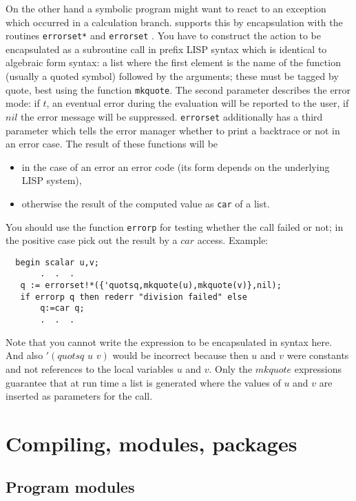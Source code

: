 On the other hand a symbolic program might want to react
to an exception which occurred in a calculation branch.
{\reduce} supports this by encapsulation with the routines
{\tt errorset*} and {\tt errorset}
. You have to
construct the action to be encapsulated as a subroutine
call in prefix LISP syntax which is identical to
algebraic form syntax: a list where the first element
is the name of the function (usually a
quoted symbol) followed by the arguments; these
must be tagged by quote, best using the function
{\tt mkquote}.
The second parameter describes the error mode: if $t$, an eventual
error during the evaluation will be reported to the user,
if $nil$ the error message will be suppressed. {\tt errorset}
additionally has a third parameter which tells the
error manager whether to print a backtrace or not in an
error case. The result of these functions will be 
\begin{itemize}
\item in the case of an error an error code (its form depends
  on the underlying LISP system),
\item otherwise the result of the computed value as {\tt car} of a list.
\end{itemize} 
You should use the function {\tt errorp} for testing
whether the call failed or not; in the positive case
pick out the result by a $car$
access. Example:
\begin{verbatim}
  begin scalar u,v;
       .  .  .
   q := errorset!*({'quotsq,mkquote(u),mkquote(v)},nil);
   if errorp q then rederr "division failed" else
       q:=car q;
       .  .  .
\end{verbatim}
Note that you cannot write the expression to be
encapsulated in {\reduce} syntax here. And also $'(quotsq\,\, u\,\, v)$
would be incorrect because then $u$ and $v$ were
constants and not references to the local
variables $u$ and $v$. Only the $mkquote$ expressions
guarantee that at run time a list is generated where
the values of $u$ and $v$ are inserted as parameters for
the call.
\section{Compiling, modules, packages}

\subsection{Program modules}

